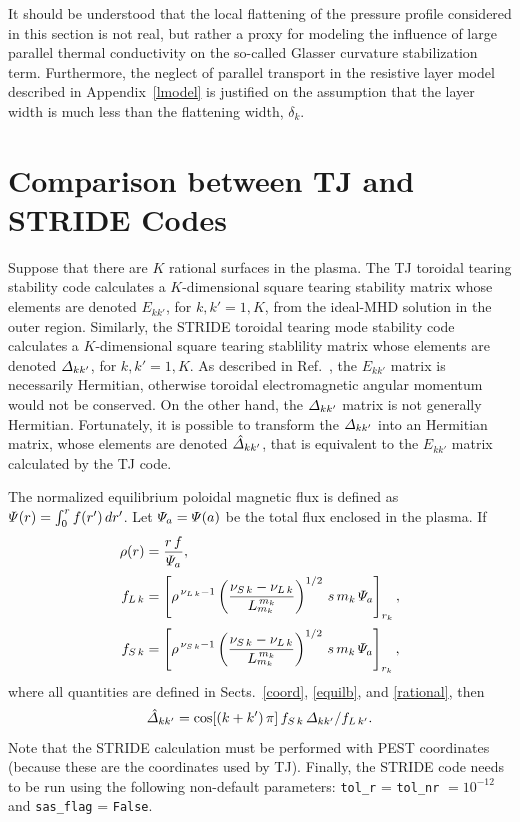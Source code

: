 \documentclass[12pt,prb,aps]{revtex4-1}
\begin{document}
It should be understood that the local flattening of the pressure profile considered in this section is not real, but rather a proxy for modeling the influence of large parallel thermal conductivity on the so-called 
Glasser curvature stabilization term.\cite{ggj,ggj1,con1} Furthermore,  the neglect of parallel transport in the resistive layer model
described in Appendix~\ref{lmodel} is justified on the assumption that the layer width is much less than the flattening width, $\delta_{k}$. 

\section{Comparison between TJ and STRIDE Codes}\label{comp}
Suppose that there are $K$ rational surfaces in the plasma. 
The TJ toroidal tearing stability code calculates a $K$-dimensional square tearing stability matrix whose elements are denoted $E_{kk'}$, for $k,k'=1,K$, from the
ideal-MHD solution in the outer region.\cite{tj} Similarly, the STRIDE toroidal tearing mode stability code calculates a $K$-dimensional square tearing stablility
matrix whose elements are denoted ${\mit\Delta}_{kk'}$, for $k,k'=1,K$.\cite{aglas1} As described in Ref.~, the $E_{kk'}$ matrix is necessarily Hermitian,
otherwise toroidal electromagnetic angular momentum would not be conserved. On the other hand, the ${\mit\Delta}_{kk'}$ matrix is not generally Hermitian. 
Fortunately, it is possible to transform the ${\mit\Delta}_{kk'}$ into an Hermitian matrix, whose elements are denoted $\hat{\mit\Delta}_{kk'}$, 
that is equivalent to the $E_{kk'}$ matrix calculated by the TJ code. 

The normalized  equilibrium poloidal magnetic flux is defined as ${\mit\Psi}(r)= \int_0^r f(r')\,dr'$. Let ${\mit\Psi}_a={\mit\Psi}(a)$ be the total flux enclosed in the plasma. 
If
\begin{align}
\rho(r) &= \frac{r\,f}{{\mit\Psi}_a},\\[0.5ex]
f_{L\,k}& = \left[\rho^{\,\nu_{L\,k}-1}\left(\frac{\nu_{S\,k}-\nu_{L\,k}}{L_{m_k}^{\,m_k}}\right)^{1/2}\,s\,m_k\,{\mit\Psi}_a\right]_{r_k},\\[0.5ex]
f_{S\,k}& = \left[\rho^{\,\nu_{S\,k}-1}\left(\frac{\nu_{S\,k}-\nu_{L\,k}}{L_{m_k}^{\,m_k}}\right)^{1/2}\,s\,m_k\,{\mit\Psi}_a\right]_{r_k},
\end{align}
where all quantities are defined in Sects.~\ref{coord}, \ref{equilb}, and \ref{rational}, then
\begin{equation}
\hat{\mit\Delta}_{kk'} = \cos[(k+k')\,\pi]\,f_{S\,k}\,{\mit\Delta}_{kk'}/f_{L\,k'}.
\end{equation}
Note that the STRIDE calculation must be performed with PEST coordinates (because these are the coordinates used by TJ). Finally, the
STRIDE code needs to be run using the following non-default parameters: \verb|tol_r| = \verb|tol_nr| $=10^{-12}$ and \verb|sas_flag| = \verb|False|. 
\end{document}
